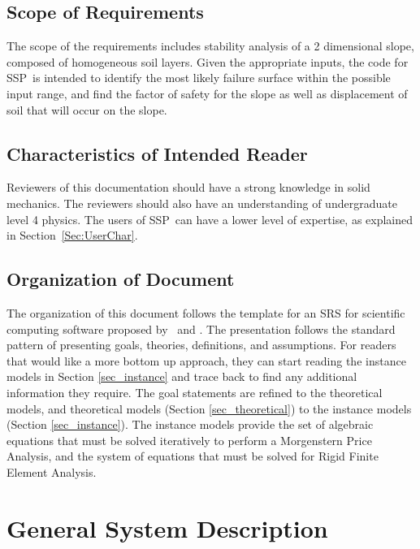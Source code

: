\documentclass[12pt]{article}
\newcommand{\progname}{SSP}
\begin{document}
\subsection{Scope of Requirements} 

The scope of the requirements includes stability analysis of a 2 dimensional slope, 
composed of homogeneous soil layers. Given the appropriate inputs, the code for 
\progname\ is intended to identify the most likely failure surface within the possible input
 range, and find the factor of safety for the slope as well as displacement of
 soil that will occur on the slope.

\subsection{Characteristics of Intended Reader}
\label{Sec:CharofInteRead}
Reviewers of this documentation should have a strong knowledge in solid mechanics. The reviewers should also have an understanding of undergraduate level 4 physics. The users of \progname\ can have a lower level of expertise, as explained in Section~\ref{Sec:UserChar}.

\subsection{Organization of Document}

The organization of this document follows the template for an SRS for
scientific computing software proposed by~\cite{Koothoor2013} and
\cite{SmithAndLai2005}.  The presentation follows the standard pattern
of presenting goals, theories, definitions, and assumptions.  For
readers that would like a more bottom up approach, they can start
reading the instance models in Section \ref{sec_instance} and trace
back to find any additional information they require. The goal statements 
are refined to the theoretical models, and
theoretical models (Section \ref{sec_theoretical}) to the instance
models (Section \ref{sec_instance}). The instance
models provide the set of algebraic equations that must be solved
iteratively to perform a Morgenstern Price Analysis, and the system of
equations that must be solved for Rigid Finite Element Analysis.


\section{General System Description}
\end{document}
